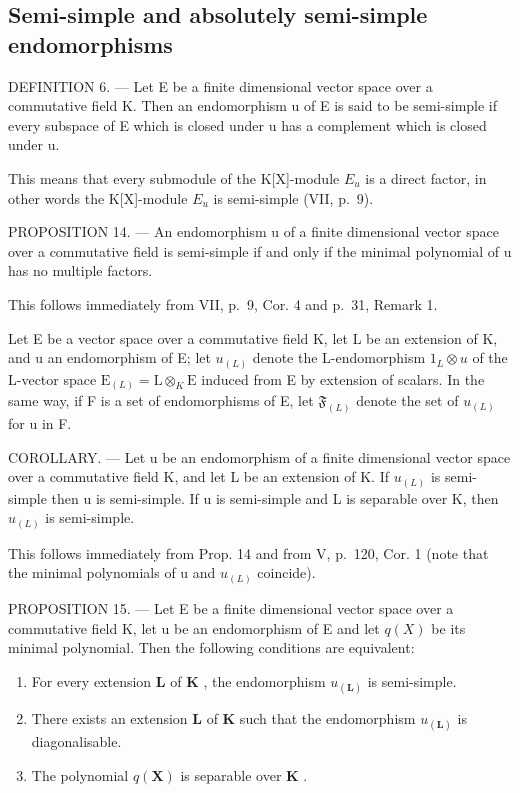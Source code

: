 \subsection{Semi-simple and absolutely semi-simple endomorphisms}

DEFINITION 6. --- Let E be a finite dimensional vector space over a commutative field K. Then an endomorphism u of E is said to be semi-simple if every subspace of E which is closed under u has a complement which is closed under u.

This means that every submodule of the K{[}X{]}-module \(E_{u}\) is a direct factor, in other words the K{[}X{]}-module \(E_{u}\) is semi-simple (VII, p.~9).

PROPOSITION 14. --- An endomorphism u of a finite dimensional vector space over a commutative field is semi-simple if and only if the minimal polynomial of u has no multiple factors.

This follows immediately from VII, p.~9, Cor. 4 and p.~31, Remark 1.

Let E be a vector space over a commutative field K, let L be an extension of K, and u an endomorphism of E; let \(u_{(L)}\) denote the L-endomorphism \(1_{L} \otimes u\) of the L-vector space \(\mathrm{E}_{(L)} = \mathrm{L} \otimes_{K} \mathrm{E}\) induced from E by extension of scalars. In the same way, if F is a set of endomorphisms of E, let \(\mathfrak{F}_{(L)}\) denote the set of \(u_{(L)}\) for u in F.

COROLLARY. --- Let u be an endomorphism of a finite dimensional vector space over a commutative field K, and let L be an extension of K. If \(u_{(L)}\) is semi-simple then u is semi-simple. If u is semi-simple and L is separable over K, then \(u_{(L)}\) is semi-simple.

This follows immediately from Prop. 14 and from V, p.~120, Cor. 1 (note that the minimal polynomials of u and \(u_{(L)}\) coincide).

PROPOSITION 15. --- Let E be a finite dimensional vector space over a commutative field K, let u be an endomorphism of E and let \(q(X)\) be its minimal polynomial. Then the following conditions are equivalent:

\begin{enumerate}
\def\labelenumi{(\roman{enumi})}
\item
  For every extension \(\mathbf{L}\) of \(\mathbf{K}\) , the endomorphism \(u_{(\mathbf{L})}\) is semi-simple.
\item
  There exists an extension \(\mathbf{L}\) of \(\mathbf{K}\) such that the endomorphism \(u_{(\mathbf{L})}\) is diagonalisable.
\item
  The polynomial \(q(\mathbf{X})\) is separable over \(\mathbf{K}\) .
\end{enumerate}

